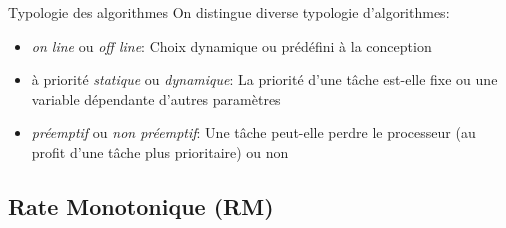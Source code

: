 \begin{frame}{Typologie des algorithmes}
  On distingue diverse typologie d'algorithmes:
  \begin{itemize}
  \item  \emph{on  line}  ou   \emph{off  line}:  Choix  dynamique  ou
    prédéfini à la conception
  \item  à priorité \emph{statique}  ou \emph{dynamique}:  La priorité
    d'une  tâche est-elle  fixe  ou une  variable dépendante  d'autres
    paramètres 
  \item \emph{préemptif} ou  \emph{non préemptif}: Une tâche peut-elle
    perdre le  processeur (au profit d'une tâche  plus prioritaire) ou
    non
  \end{itemize}
\end{frame}


\subsection{Rate Monotonique (RM)}

